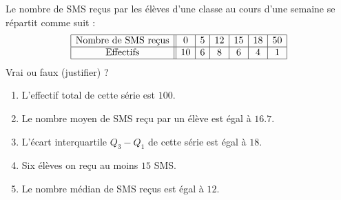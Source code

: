 
\begin{exercice}\label{exosmath-0530}

    Le nombre de SMS reçus par les élèves d'une classe au cours d'une semaine se répartit comme suit :
    \begin{equation*}
        \begin{array}[]{|c||c|c|c|c|c|c|}
            \hline
            \text{Nombre de SMS reçus}&0&5&12&15&18&50\\
            \hline
            \text{Effectifs}&10&6&8&6&4&1\\
            \hline
        \end{array}
    \end{equation*}
    Vrai ou faux (justifier) ?
    \begin{enumerate}
        \item
            L'effectif total de cette série est \( 100\).
        \item
            Le nombre moyen de SMS reçu par un élève est égal à \( 16.7\).
        \item
            L'écart interquartile \( Q_3-Q_1\) de cette série est égal à \( 18\).
        \item
            Six élèves on reçu au moins \( 15\) SMS.
        \item
            Le nombre médian de SMS reçus est égal à \( 12\).
    \end{enumerate}

\end{exercice}
